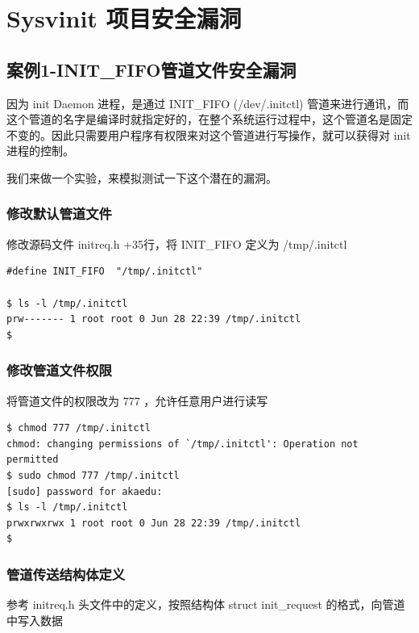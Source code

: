 \chapter{Sysvinit 项目安全漏洞}

\section{案例1-INIT\_FIFO管道文件安全漏洞}

因为 init Daemon 进程，是通过 INIT\_FIFO (/dev/.initctl)
管道来进行通讯，而这个管道的名字是编译时就指定好的，在整个系统运行过程中，这个管道名是固定不变的。因此只需要用户程序有权限来对这个管道进行写操作，就可以获得对
init 进程的控制。

我们来做一个实验，来模拟测试一下这个潜在的漏洞。

\subsection{修改默认管道文件}

修改源码文件 initreq.h +35行，将 INIT\_FIFO 定义为 /tmp/.initctl

{\begin{shaded}\begin{verbatim}
#define INIT_FIFO  "/tmp/.initctl"

$ ls -l /tmp/.initctl 
prw------- 1 root root 0 Jun 28 22:39 /tmp/.initctl
$ 
\end{verbatim}\end{shaded}}
\subsection{修改管道文件权限}

将管道文件的权限改为 777 ，允许任意用户进行读写

{\begin{shaded}\begin{verbatim}
$ chmod 777 /tmp/.initctl 
chmod: changing permissions of `/tmp/.initctl': Operation not permitted
$ sudo chmod 777 /tmp/.initctl 
[sudo] password for akaedu: 
$ ls -l /tmp/.initctl 
prwxrwxrwx 1 root root 0 Jun 28 22:39 /tmp/.initctl
$ 
\end{verbatim}\end{shaded}}
\subsection{管道传送结构体定义}

参考 initreq.h 头文件中的定义，按照结构体 struct init\_request
的格式，向管道中写入数据

